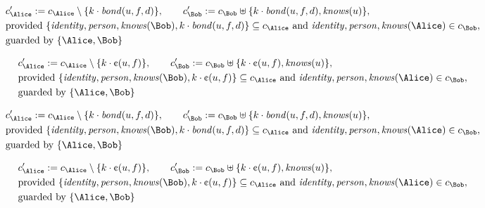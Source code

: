 \begin{align*}
&
c'_
{
\Alice
}
 := 
c_
{
\Alice
}
 \setminus 
\{
k
\cdot
\mathit{
bond
}
(
u
,
f
,
d
)
\}
, \qquad 
c'_
{
\Bob
}
 := 
c_
{
\Bob
}
 \uplus 
\{
k
\cdot
\mathit{
bond
}
(
u
,
f
,
d
)
,
\mathit{
knows
}
(
u
)
\}
,\\
&
\text{provided } 
\{
\mathit{
identity
}
,
\mathit{
person
}
,
\mathit{
knows
}
(
\Bob
)
,
k
\cdot
\mathit{
bond
}
(
u
,
f
,
d
)
\}
 \subseteq c_
{
\Alice
}
 \text{ and } 
\mathit{
identity
}
,
\mathit{
person
}
,
\mathit{
knows
}
(
\Alice
)
 \in c_
{
\Bob
}
,\\
&
\text{guarded by } \{
\Alice
,
\Bob
\}
\end{align*}

\begin{align*}
&
c'_
{
\Alice
}
 := 
c_
{
\Alice
}
 \setminus 
\{
k
\cdot
\text{\textcent}
(
u
,
f
)
\}
, \qquad 
c'_
{
\Bob
}
 := 
c_
{
\Bob
}
 \uplus 
\{
k
\cdot
\text{\textcent}
(
u
,
f
)
,
\mathit{
knows
}
(
u
)
\}
,\\
&
\text{provided } 
\{
\mathit{
identity
}
,
\mathit{
person
}
,
\mathit{
knows
}
(
\Bob
)
,
k
\cdot
\text{\textcent}
(
u
,
f
)
\}
 \subseteq c_
{
\Alice
}
 \text{ and } 
\mathit{
identity
}
,
\mathit{
person
}
,
\mathit{
knows
}
(
\Alice
)
 \in c_
{
\Bob
}
,\\
&
\text{guarded by } \{
\Alice
,
\Bob
\}
\end{align*}

\begin{align*}
&
c'_
{
\Alice
}
 := 
c_
{
\Alice
}
 \setminus 
\{
k
\cdot
\mathit{
bond
}
(
u
,
f
,
d
)
\}
, \qquad 
c'_
{
\Bob
}
 := 
c_
{
\Bob
}
 \uplus 
\{
k
\cdot
\mathit{
bond
}
(
u
,
f
,
d
)
,
\mathit{
knows
}
(
u
)
\}
,\\
&
\text{provided } 
\{
\mathit{
identity
}
,
\mathit{
person
}
,
\mathit{
knows
}
(
\Bob
)
,
k
\cdot
\mathit{
bond
}
(
u
,
f
,
d
)
\}
 \subseteq c_
{
\Alice
}
 \text{ and } 
\mathit{
identity
}
,
\mathit{
person
}
,
\mathit{
knows
}
(
\Alice
)
 \in c_
{
\Bob
}
,\\
&
\text{guarded by } \{
\Alice
,
\Bob
\}
\end{align*}

\begin{align*}
&
c'_
{
\Alice
}
 := 
c_
{
\Alice
}
 \setminus 
\{
k
\cdot
\text{\textcent}
(
u
,
f
)
\}
, \qquad 
c'_
{
\Bob
}
 := 
c_
{
\Bob
}
 \uplus 
\{
k
\cdot
\text{\textcent}
(
u
,
f
)
,
\mathit{
knows
}
(
u
)
\}
,\\
&
\text{provided } 
\{
\mathit{
identity
}
,
\mathit{
person
}
,
\mathit{
knows
}
(
\Bob
)
,
k
\cdot
\text{\textcent}
(
u
,
f
)
\}
 \subseteq c_
{
\Alice
}
 \text{ and } 
\mathit{
identity
}
,
\mathit{
person
}
,
\mathit{
knows
}
(
\Alice
)
 \in c_
{
\Bob
}
,\\
&
\text{guarded by } \{
\Alice
,
\Bob
\}
\end{align*}
